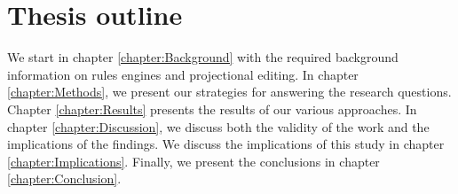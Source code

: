 \section{Thesis outline}

We start in chapter \ref{chapter:Background} with the required background information on rules engines and projectional editing.
In chapter \ref{chapter:Methods}, we present our strategies for answering the research questions.
Chapter \ref{chapter:Results} presents the results of our various approaches.
In chapter \ref{chapter:Discussion}, we discuss both the validity of the work and the implications of the findings.
We discuss the implications of this study in chapter \ref{chapter:Implications}.
Finally, we present the conclusions in chapter \ref{chapter:Conclusion}.
